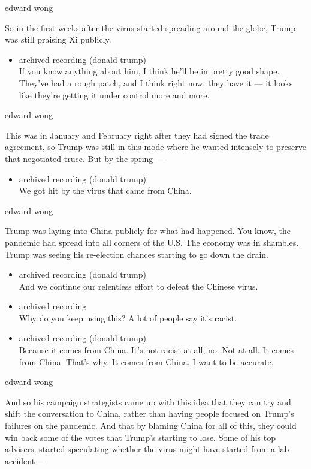 edward wong

So in the first weeks after the virus started spreading around the
globe, Trump was still praising Xi publicly.

\begin{itemize}
\tightlist
\item
  archived recording (donald trump)\\
  If you know anything about him, I think he'll be in pretty good shape.
  They've had a rough patch, and I think right now, they have it --- it
  looks like they're getting it under control more and more.
\end{itemize}

edward wong

This was in January and February right after they had signed the trade
agreement, so Trump was still in this mode where he wanted intensely to
preserve that negotiated truce. But by the spring ---

\begin{itemize}
\tightlist
\item
  archived recording (donald trump)\\
  We got hit by the virus that came from China.
\end{itemize}

edward wong

Trump was laying into China publicly for what had happened. You know,
the pandemic had spread into all corners of the U.S. The economy was in
shambles. Trump was seeing his re-election chances starting to go down
the drain.

\begin{itemize}
\item
  archived recording (donald trump)\\
  And we continue our relentless effort to defeat the Chinese virus.
\item
  archived recording\\
  Why do you keep using this? A lot of people say it's racist.
\item
  archived recording (donald trump)\\
  Because it comes from China. It's not racist at all, no. Not at all.
  It comes from China. That's why. It comes from China. I want to be
  accurate.
\end{itemize}

edward wong

And so his campaign strategists came up with this idea that they can try
and shift the conversation to China, rather than having people focused
on Trump's failures on the pandemic. And that by blaming China for all
of this, they could win back some of the votes that Trump's starting to
lose. Some of his top advisers. started speculating whether the virus
might have started from a lab accident ---

